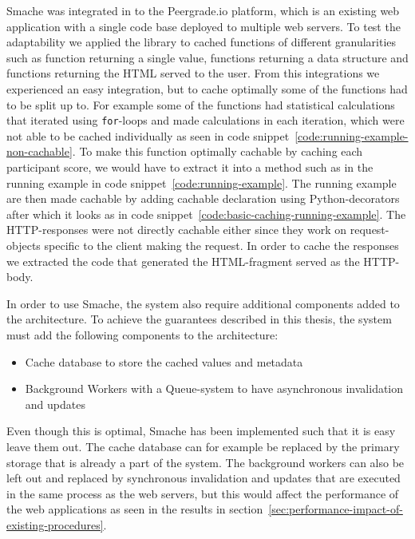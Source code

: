 Smache was integrated in to the Peergrade.io platform, which is an existing web application with a single code base deployed to multiple web servers. To test the adaptability we applied the library to cached functions of different granularities such as function returning a single value, functions returning a data structure and functions returning the HTML served to the user. From this integrations we experienced an easy integration, but to cache optimally some of the functions had to be split up to.
For example some of the functions had statistical calculations that iterated using \verb$for$-loops and made calculations in each iteration, which were not able to be cached individually as seen in code snippet~\ref{code:running-example-non-cachable}. To make this function optimally cachable by caching each participant score, we would have to extract it into a method such as in the running example in code snippet~\ref{code:running-example}. The running example are then made cachable by adding cachable declaration using Python-decorators after which it looks as in code snippet~\ref{code:basic-caching-running-example}.
The HTTP-responses were not directly cachable either since they work on request-objects specific to the client making the request. In order to cache the responses we extracted the code that generated the HTML-fragment served as the HTTP-body.

In order to use Smache, the system also require additional components added to the architecture. To achieve the guarantees described in this thesis, the system must add the following components to the architecture:

\begin{itemize}
  \item Cache database to store the cached values and metadata
  \item Background Workers with a Queue-system to have asynchronous invalidation and updates
\end{itemize}

Even though this is optimal, Smache has been implemented such that it is easy leave them out. The cache database can for example be replaced by the primary storage that is already a part of the system. The background workers can also be left out and replaced by synchronous invalidation and updates that are executed in the same process as the web servers, but this would affect the performance of the web applications as seen in the results in section~\ref{sec:performance-impact-of-existing-procedures}.


